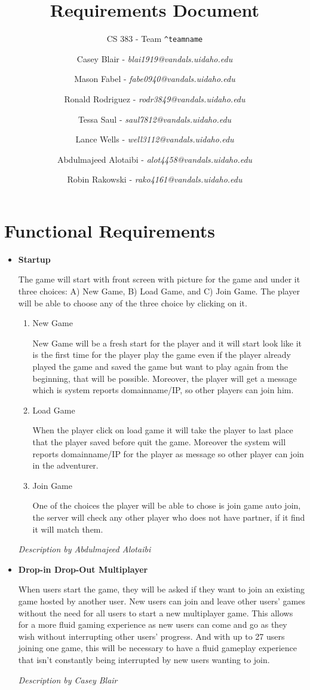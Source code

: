 \documentclass[12pt]{article}
\title{Requirements Document}
\subtitle{CS 383 - Team \texttt{\textasciicircum teamname}}
\author{
Casey Blair - \textit{blai1919@vandals.uidaho.edu} \\
\and Mason Fabel - \textit{fabe0940@vandals.uidaho.edu} \\
\and Ronald Rodriguez - \textit{rodr3849@vandals.uidaho.edu} \\
\and Tessa Saul - \textit{saul7812@vandals.uidaho.edu} \\
\and Lance Wells - \textit{well3112@vandals.uidaho.edu} \\
\and Abdulmajeed Alotaibi - \textit{alot4458@vandals.uidaho.edu} \\
\and Robin Rakowski - \textit{rako4161@vandals.uidaho.edu} \\
}
\begin{document}
\maketitle

\section{Functional Requirements}
\begin{itemize}
	\item \textbf{Startup}
	
	The game will start with front screen with picture for the game and under
	it three choices: A) New Game, B) Load Game, and C) Join Game. The player
	will be able to choose any of the three choice by clicking on it.

	\begin{enumerate}
	\item New Game

	New Game will be a fresh start for the player and it will start look like
	it is the first time for the player play the game even if the player
	already played the game and saved the game but want to play again from the
	beginning, that will be possible. Moreover, the player will get a message
	which is system reports domainname/IP, so other players can join him.

	\item Load Game

	When the player click on load game it will take the player to last place
	that the player saved before quit the game. Moreover the system will
	reports domainname/IP for the player as message so other player can join in
	the adventurer.

	\item Join Game

	One of the choices the player will be able to chose is join game auto join,
	the server will check any other player who does not have partner, if it
	find it will match them.
	\end{enumerate}
	
	\emph{Description by Abdulmajeed Alotaibi}
	
	\item \textbf{Drop-in Drop-Out Multiplayer}
	
	 When users start the game, they will be asked if they want to join an existing game hosted by another user. New users can join and leave other users’ games without the need for all users to start a new multiplayer game. This allows
for a more fluid gaming experience as new users can come and go as they wish without interrupting other users’ progress. And with up to 27 users joining one game, this will be necessary to have a fluid gameplay experience that isn’t constantly being interrupted by new users wanting to
join.

\emph{Description by Casey Blair}
\end{itemize}
\end{document}
